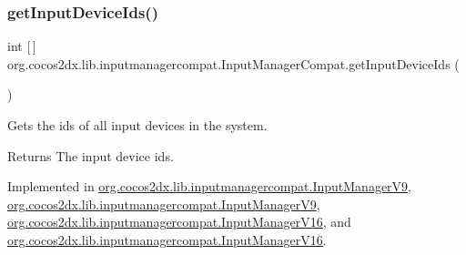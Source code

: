 \mbox{\label{interfaceorg_1_1cocos2dx_1_1lib_1_1inputmanagercompat_1_1InputManagerCompat_a1601bfbe1b4871a935d49a2a4094e5ac}} 
\subsubsection{\texorpdfstring{get\+Input\+Device\+Ids()}{getInputDeviceIds()}\hspace{0.1cm}{\footnotesize\ttfamily [2/2]}}
{\footnotesize\ttfamily int \mbox{[}$\,$\mbox{]} org.\+cocos2dx.\+lib.\+inputmanagercompat.\+Input\+Manager\+Compat.\+get\+Input\+Device\+Ids (\begin{DoxyParamCaption}{ }\end{DoxyParamCaption})}

Gets the ids of all input devices in the system.

\begin{DoxyReturn}{Returns}
The input device ids. 
\end{DoxyReturn}


Implemented in \hyperlink{classorg_1_1cocos2dx_1_1lib_1_1inputmanagercompat_1_1InputManagerV9_a86d73356f6ea15f86459dcfbf70fa23e}{org.\+cocos2dx.\+lib.\+inputmanagercompat.\+Input\+Manager\+V9}, \hyperlink{classorg_1_1cocos2dx_1_1lib_1_1inputmanagercompat_1_1InputManagerV9_a86d73356f6ea15f86459dcfbf70fa23e}{org.\+cocos2dx.\+lib.\+inputmanagercompat.\+Input\+Manager\+V9}, \hyperlink{classorg_1_1cocos2dx_1_1lib_1_1inputmanagercompat_1_1InputManagerV16_a41ff1ae73d68436be41859a4ac5f2e62}{org.\+cocos2dx.\+lib.\+inputmanagercompat.\+Input\+Manager\+V16}, and \hyperlink{classorg_1_1cocos2dx_1_1lib_1_1inputmanagercompat_1_1InputManagerV16_a41ff1ae73d68436be41859a4ac5f2e62}{org.\+cocos2dx.\+lib.\+inputmanagercompat.\+Input\+Manager\+V16}.

\mbox{\label{interfaceorg_1_1cocos2dx_1_1lib_1_1inputmanagercompat_1_1InputManagerCompat_a813a0308659d716c9503d44ccb48ebb1}} 
